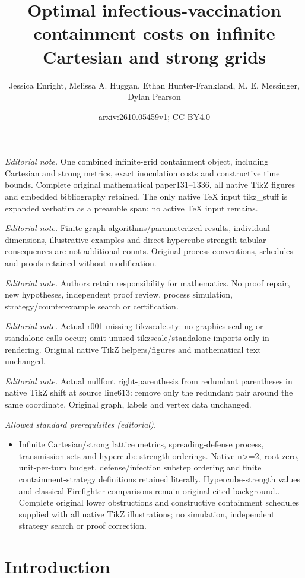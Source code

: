 \documentclass[unknownkeysallowed]{article}
\title{Optimal infectious-vaccination containment costs on infinite Cartesian and strong grids}
\author{Jessica Enright, Melissa A. Huggan, Ethan Hunter-Frankland, M. E. Messinger, Dylan Pearson}
\date{arxiv:2610.05459v1; CC BY4.0}
\theoremstyle{definition}\newtheorem{strategy}{Strategy}
\theoremstyle{definition}\newtheorem{notation}{Notation}[theorem]
\begin{document}
\maketitle
\noindent\textit{Editorial note.} One combined infinite-grid containment object, including Cartesian and strong metrics, exact inoculation costs and constructive time bounds. Complete original mathematical paper131--1336, all native TikZ figures and embedded bibliography retained. The only native TeX input tikz\_stuff is expanded verbatim as a preamble span; no active TeX input remains.\par\medskip
\noindent\textit{Editorial note.} Finite-graph algorithms/parameterized results, individual dimensions, illustrative examples and direct hypercube-strength tabular consequences are not additional counts. Original process conventions, schedules and proofs retained without modification.\par\medskip
\noindent\textit{Editorial note.} Authors retain responsibility for mathematics. No proof repair, new hypotheses, independent proof review, process simulation, strategy/counterexample search or certification.\par\medskip
\noindent\textit{Editorial note.} Actual r001 missing tikzscale.sty: no graphics scaling or standalone calls occur; omit unused tikzscale/standalone imports only in rendering. Original native TikZ helpers/figures and mathematical text unchanged.\par\medskip
\noindent\textit{Editorial note.} Actual nullfont right-parenthesis from redundant parentheses in native TikZ shift at source line613: remove only the redundant pair around the same coordinate. Original graph, labels and vertex data unchanged.\par\medskip
\noindent\textit{Allowed standard prerequisites (editorial).}\begin{itemize}
\item Infinite Cartesian/strong lattice metrics, spreading-defense process, transmission sets and hypercube strength orderings. Native n>=2, root zero, unit-per-turn budget, defense/infection substep ordering and finite containment-strategy definitions retained literally. Hypercube-strength values and classical Firefighter comparisons remain original cited background.. Complete original lower obstructions and constructive containment schedules supplied with all native TikZ illustrations; no simulation, independent strategy search or proof correction.
\end{itemize}\medskip
\section{Introduction}\label{sec:background}
\end{document}
